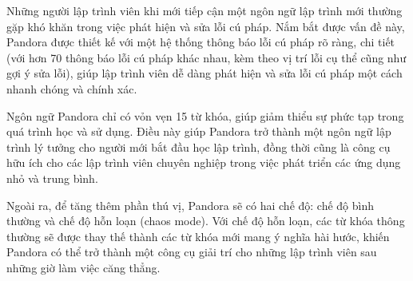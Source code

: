     Những người lập trình viên khi mới tiếp cận một ngôn ngữ lập trình mới thường gặp khó khăn trong việc phát hiện và sửa lỗi cú pháp. Nắm bắt được vấn đề này, Pandora được thiết kế với một hệ thống thông báo lỗi cú pháp rõ ràng, chi tiết (với hơn 70 thông báo lỗi cú pháp khác nhau, kèm theo vị trí lỗi cụ thể cũng như gợi ý sửa lỗi), giúp lập trình viên dễ dàng phát hiện và sửa lỗi cú pháp một cách nhanh chóng và chính xác.

    Ngôn ngữ Pandora chỉ có vỏn vẹn 15 từ khóa, giúp giảm thiểu sự phức tạp trong quá trình học và sử dụng. Điều này giúp Pandora trở thành một ngôn ngữ lập trình lý tưởng cho người mới bắt đầu học lập trình, đồng thời cũng là công cụ hữu ích cho các lập trình viên chuyên nghiệp trong việc phát triển các ứng dụng nhỏ và trung bình. 

    Ngoài ra, để tăng thêm phần thú vị, Pandora sẽ có hai chế độ: chế độ bình thường và chế độ hỗn loạn (chaos mode). Với chế độ hỗn loạn, các từ khóa thông thường sẽ được thay thế thành các từ khóa mới mang ý nghĩa hài hước, khiến Pandora có thể trở thành một công cụ giải trí cho những lập trình viên sau những giờ làm việc căng thẳng.
